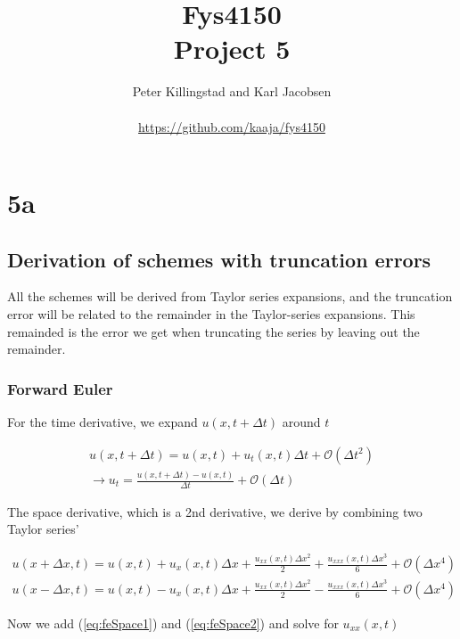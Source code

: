 \documentclass{article}
\title{Fys4150\\Project 5\\ }
\author{Peter Killingstad and Karl Jacobsen\\
\\
\url{https://github.com/kaaja/fys4150}}
\begin{document}
	
\maketitle



\section{5a}

\subsection{Derivation of schemes with truncation errors}
All the schemes will be derived from Taylor series expansions, and the truncation error will be related to the remainder in the Taylor-series expansions. This remainded is the error we get when truncating the series by leaving out the remainder.\\

\subsubsection{Forward Euler}
For the time derivative, we expand $u(x, t + \Delta t)$ around $t$

\begin{subequations}
	\begin{align}
		u(x, t+ \Delta t)  = u(x,t) +  u_t(x,t) \Delta t + \mathcal{O}(\Delta t^2)\\
		\rightarrow u_t = \frac{u(x, t+ \Delta t) - u(x,t)}{\Delta t} + \mathcal{O}(\Delta t)\label{eq:FeTime}
	\end{align}
\end{subequations}

The space derivative, which is a 2nd derivative, we derive by combining two Taylor series'

\begin{subequations}
	\begin{align}
		u(x + \Delta x,t) = u(x,t) + u_x(x,t)\Delta x + \frac{u_{xx}(x,t) \Delta x^2}{2} + \frac{u_{xxx}(x,t) \Delta x^3}{6} + \mathcal{O}(\Delta x^4)\label{eq:feSpace1}\\
		u(x - \Delta x,t) = u(x,t) - u_x(x,t)\Delta x + \frac{u_{xx}(x,t) \Delta x^2}{2} - \frac{u_{xxx}(x,t) \Delta x^3}{6} + \mathcal{O}(\Delta x^4)\label{eq:feSpace2}
	\end{align}
\end{subequations}

Now we add (\ref{eq:feSpace1}) and (\ref{eq:feSpace2}) and solve for $u_{xx}(x,t)$
\end{document}
